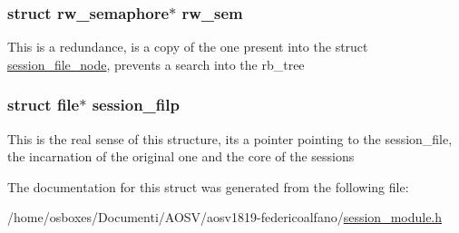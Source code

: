 \subsubsection[{\texorpdfstring{rw\+\_\+sem}{rw_sem}}]{\setlength{\rightskip}{0pt plus 5cm}struct rw\+\_\+semaphore$\ast$ rw\+\_\+sem}\hypertarget{structsession__priv__data_a0eba6b6e0bbe3d55110a724c3c08d1c2}{}\label{structsession__priv__data_a0eba6b6e0bbe3d55110a724c3c08d1c2}
This is a redundance, is a copy of the one present into the struct \hyperlink{structsession__file__node}{session\+\_\+file\+\_\+node}, prevents a search into the rb\+\_\+tree 
\subsubsection[{\texorpdfstring{session\+\_\+filp}{session_filp}}]{\setlength{\rightskip}{0pt plus 5cm}struct file$\ast$ session\+\_\+filp}\hypertarget{structsession__priv__data_a51a230f12c70d8408e3a829e2d958156}{}\label{structsession__priv__data_a51a230f12c70d8408e3a829e2d958156}
This is the real sense of this structure, it\textquotesingle{}s a pointer pointing to the session\+\_\+file, the incarnation of the original one and the core of the sessions 

The documentation for this struct was generated from the following file\+:\begin{DoxyCompactItemize}
\item 
/home/osboxes/\+Documenti/\+A\+O\+S\+V/aosv1819-\/federicoalfano/\hyperlink{session__module_8h}{session\+\_\+module.\+h}\end{DoxyCompactItemize}
